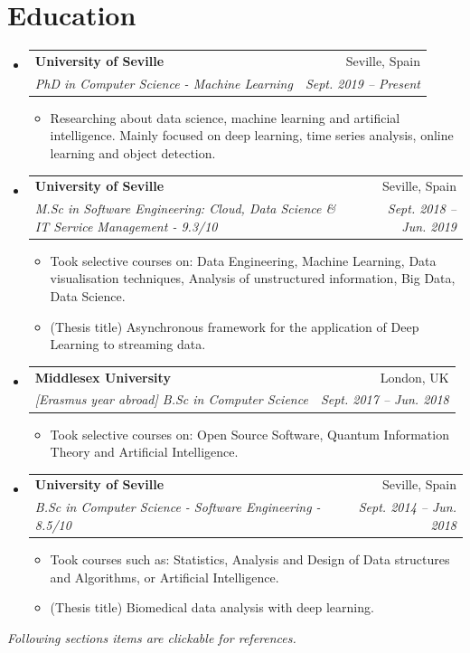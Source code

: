 \documentclass[letterpaper,11pt]{article}
\makeatletter
\newcommand{\resumeItem}[1]{%
  \item\small{
    #1
  }
}
\newcommand{\resumeSubheading}[4]{
  \vspace{0pt}\item%
    \begin{tabular*}{0.97\textwidth}[t]{l@{\extracolsep{\fill}}r}
      \textbf{#1} & #2 \\
      \textit{\small#3} & \textit{\small #4} \\
    \end{tabular*}\vspace{-5pt}
}
\newcommand{\resumeSubHeadingListStart}{\begin{itemize}[leftmargin=*]}
\newcommand{\resumeSubHeadingListEnd}{\end{itemize}}
\newcommand{\resumeItemListStart}{\begin{itemize}}
\newcommand{\resumeItemListEnd}{\end{itemize}\vspace{-5pt}}
\makeatother
\begin{document}
\section{Education}
  \resumeSubHeadingListStart
    \resumeSubheading
      {University of Seville}{Seville, Spain}
      {PhD in Computer Science - Machine Learning }{Sept. 2019 -- Present}
      \resumeItemListStart
      \resumeItem{Researching about data science, machine learning and artificial intelligence. Mainly focused on deep learning, time series analysis, online learning and object detection.}
      \resumeItemListEnd
    \resumeSubheading
      {University of Seville}{Seville, Spain}
      {M.Sc in Software Engineering: Cloud, Data Science \& IT Service Management - 9.3/10}{Sept. 2018 -- Jun. 2019}
      \resumeItemListStart
      \resumeItem{Took selective courses on: Data Engineering, Machine Learning, Data visualisation techniques, Analysis of unstructured information, Big Data, Data Science.}
      \resumeItem{(Thesis title) Asynchronous framework for the application of Deep Learning to streaming data.}
      \resumeItemListEnd
    \resumeSubheading
      {Middlesex University}{London, UK}
      {[Erasmus year abroad] B.Sc in Computer Science}{Sept. 2017 -- Jun. 2018}
      \resumeItemListStart
      \resumeItem{Took selective courses on: Open Source Software, Quantum Information Theory and Artificial Intelligence.}
      \resumeItemListEnd
    \resumeSubheading
      {University of Seville}{Seville, Spain}
      {B.Sc in Computer Science - Software Engineering - 8.5/10}{Sept. 2014 -- Jun. 2018}
      \resumeItemListStart
      \resumeItem{Took courses such as: Statistics, Analysis and Design of Data structures and Algorithms, or Artificial Intelligence.}
      \resumeItem{(Thesis title) Biomedical data analysis with deep learning.}
      \resumeItemListEnd
  \resumeSubHeadingListEnd

\hfill \textsl{ Following sections items are clickable for references.}
\vspace{-1.5em}
\end{document}
